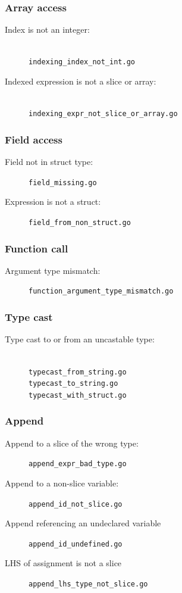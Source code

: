 \documentclass[oneside]{article}
\begin{document}
\subsubsection{Array access}
\begin{description}
  \item[Index is not an integer:]\ \\
    \verb|indexing_index_not_int.go|
  \item[Indexed expression is not a slice or array:]\ \\
    \verb|indexing_expr_not_slice_or_array.go|
\end{description}

\subsubsection{Field access}
\begin{description}
  \item[Field not in struct type:] \verb|field_missing.go|
  \item[Expression is not a struct:] \verb|field_from_non_struct.go|
\end{description}

\subsubsection{Function call}
\begin{description}
  \item[Argument type mismatch:] \verb|function_argument_type_mismatch.go|
\end{description}

\subsubsection{Type cast}
\begin{description}
  \item[Type cast to or from an uncastable type:]\ \\
    \verb|typecast_from_string.go|\\
    \verb|typecast_to_string.go|\\
    \verb|typecast_with_struct.go|
\end{description}

\subsubsection{Append}
\begin{description}
  \item[Append to a slice of the wrong type:] \verb|append_expr_bad_type.go|
  \item[Append to a non-slice variable:] \verb|append_id_not_slice.go|
  \item[Append referencing an undeclared variable] \verb|append_id_undefined.go|
  \item[LHS of assignment is not a slice] \verb|append_lhs_type_not_slice.go|
\end{description}
\end{document}

